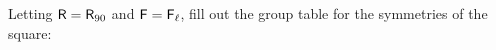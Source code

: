\documentclass{ximera}
\author{Jenny Sheldon \and Bart Snapp}
\begin{document}
\begin{exercise}
  Letting $\mathsf{R} = \mathsf{R}_{90}$ and $\mathsf{F} = \mathsf{F}_{\ell}$, fill
  out the group table for the symmetries of the square:
\end{exercise}
\end{document}
